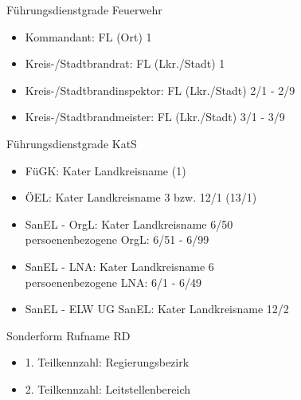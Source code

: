 \begin{hintbox}{Führungsdienstgrade Feuerwehr}
    \begin{itemize}
        \item Kommandant: FL (Ort) 1
        \item Kreis-/Stadtbrandrat: FL (Lkr./Stadt) 1
        \item Kreis-/Stadtbrandinspektor: FL (Lkr./Stadt) 2/1 - 2/9
        \item  Kreis-/Stadtbrandmeister: FL (Lkr./Stadt) 3/1 - 3/9
    \end{itemize}
\end{hintbox}
\begin{hintbox}{Führungsdienstgrade KatS}
    \begin{itemize}
        \item FüGK: Kater Landkreisname (1)
        \item ÖEL: Kater Landkreisname 3 bzw. 12/1 (13/1)
        \item SanEL - OrgL: Kater Landkreisname 6/50\\
        \ra persoenenbezogene OrgL: 6/51 - 6/99
        \item SanEL - LNA: Kater Landkreisname 6\\
        \ra persoenenbezogene LNA: 6/1 - 6/49 
        \item SanEL - ELW UG SanEL: Kater Landkreisname 12/2
    \end{itemize}
\end{hintbox}
\begin{hintbox}{Sonderform Rufname RD}
    \begin{itemize}
        \item 1. Teilkennzahl: Regierungsbezirk
        \item 2. Teilkennzahl: Leitstellenbereich
    \end{itemize}
\end{hintbox}
